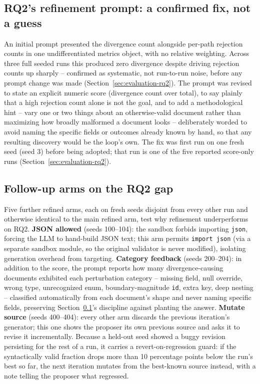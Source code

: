 \subsection{RQ2's refinement prompt: a confirmed fix, not a guess}
\label{sec:rq2-prompt}
An initial prompt presented the divergence count alongside per-path
rejection counts in one undifferentiated metrics object, with no relative
weighting. Across three full seeded runs this produced zero divergence
despite driving rejection counts up sharply -- confirmed as systematic,
not run-to-run noise, before any prompt change was made
(Section~\ref{sec:evaluation-rq2}). The prompt was revised to state an
explicit numeric score (divergence count over total), to say plainly that a
high rejection count alone is not the goal, and to add a methodological
hint -- vary one or two things about an otherwise-valid document rather
than maximizing how broadly malformed a document looks -- deliberately
worded to avoid naming the specific fields or outcomes already known by
hand, so that any resulting discovery would be the loop's own. The fix was
first run on one fresh seed (seed 3) before being adopted; that run is one
of the five reported score-only runs (Section~\ref{sec:evaluation-rq2}).

\subsection{Follow-up arms on the RQ2 gap}
\label{sec:ablation-json}\label{sec:category-feedback}\label{sec:mutate-source}
Five further refined arms, each on fresh seeds disjoint from every other
run and otherwise identical to the main refined arm, test why refinement
underperforms on RQ2. \textbf{JSON allowed} (seeds 100--104): the sandbox
forbids importing \texttt{json}, forcing the LLM to hand-build JSON text; this
arm permits \texttt{import json} (via a separate sandbox module, so the
original validator is never modified), isolating generation overhead from
targeting. \textbf{Category feedback} (seeds 200--204): in addition to the
score, the prompt reports how many divergence-causing documents exhibited
each perturbation category -- missing field, null override, wrong type,
unrecognized enum, boundary-magnitude \texttt{id}, extra key, deep nesting --
classified automatically from each document's shape and never naming
specific fields, preserving Section~\ref{sec:rq2-prompt}'s discipline
against planting the answer. \textbf{Mutate source} (seeds 400--404): every
other arm discards the previous iteration's generator; this one shows the
proposer its own previous source and asks it to revise it incrementally.
Because a held-out seed showed a buggy revision persisting for the rest of
a run, it carries a revert-on-regression guard: if the syntactically valid
fraction drops more than 10 percentage points below the run's best so far,
the next iteration mutates from the best-known source instead, with a note
telling the proposer what regressed.

